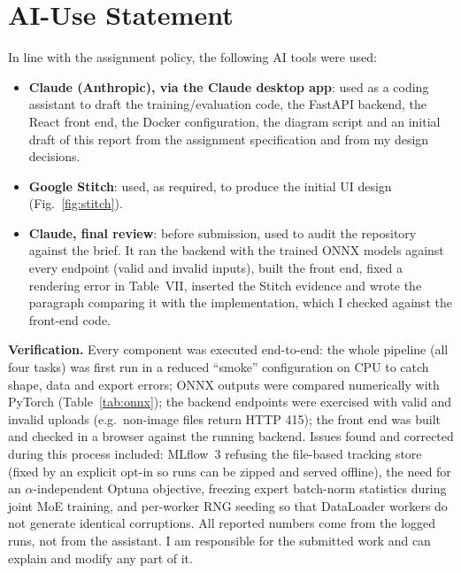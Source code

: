 \documentclass[conference]{IEEEtran}
\begin{document}
\appendices
\section{AI-Use Statement}
In line with the assignment policy, the following AI tools were used:
\begin{itemize}
\item \textbf{Claude (Anthropic), via the Claude desktop app}: used as a coding assistant to draft the training/evaluation code, the FastAPI backend, the React front end, the Docker configuration, the diagram script and an initial draft of this report from the assignment specification and from my design decisions.
\item \textbf{Google Stitch}: used, as required, to produce the initial UI design (Fig.~\ref{fig:stitch}).
\item \textbf{Claude, final review}: before submission, used to audit the repository against the brief. It ran the backend with the trained ONNX models against every endpoint (valid and invalid inputs), built the front end, fixed a rendering error in Table~VII, inserted the Stitch evidence and wrote the paragraph comparing it with the implementation, which I checked against the front-end code.
\end{itemize}
\textbf{Verification.} Every component was executed end-to-end: the whole pipeline (all four tasks) was first run in a reduced ``smoke'' configuration on CPU to catch shape, data and export errors; ONNX outputs were compared numerically with PyTorch (Table~\ref{tab:onnx}); the backend endpoints were exercised with valid and invalid uploads (e.g.\ non-image files return HTTP 415); the front end was built and checked in a browser against the running backend. Issues found and corrected during this process included: MLflow~3 refusing the file-based tracking store (fixed by an explicit opt-in so runs can be zipped and served offline), the need for an $\alpha$-independent Optuna objective, freezing expert batch-norm statistics during joint MoE training, and per-worker RNG seeding so that DataLoader workers do not generate identical corruptions. All reported numbers come from the logged runs, not from the assistant. I am responsible for the submitted work and can explain and modify any part of it.
\end{document}
